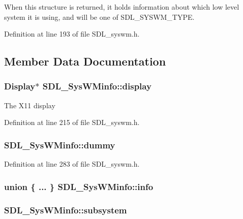 When this structure is returned, it holds information about which low level system it is using, and will be one of S\-D\-L\-\_\-\-S\-Y\-S\-W\-M\-\_\-\-T\-Y\-P\-E. 

Definition at line 193 of file S\-D\-L\-\_\-syswm.\-h.



\subsection{Member Data Documentation}
\hypertarget{struct_s_d_l___sys_w_minfo_a58ef8bc8e1065e95e75a08d08f4a4741}{
\subsubsection[{display}]{\setlength{\rightskip}{0pt plus 5cm}Display$\ast$ S\-D\-L\-\_\-\-Sys\-W\-Minfo\-::display}}\label{struct_s_d_l___sys_w_minfo_a58ef8bc8e1065e95e75a08d08f4a4741}
The X11 display 

Definition at line 215 of file S\-D\-L\-\_\-syswm.\-h.

\hypertarget{struct_s_d_l___sys_w_minfo_a1edbb8fc4fc59081efe6070f9167c1cf}{
\subsubsection[{dummy}]{ S\-D\-L\-\_\-\-Sys\-W\-Minfo\-::dummy}}\label{struct_s_d_l___sys_w_minfo_a1edbb8fc4fc59081efe6070f9167c1cf}


Definition at line 283 of file S\-D\-L\-\_\-syswm.\-h.

\hypertarget{struct_s_d_l___sys_w_minfo_ab928935e7f73776e61ecc4c169a146f2}{
\subsubsection[{info}]{\setlength{\rightskip}{0pt plus 5cm}union \{ ... \}   S\-D\-L\-\_\-\-Sys\-W\-Minfo\-::info}}\label{struct_s_d_l___sys_w_minfo_ab928935e7f73776e61ecc4c169a146f2}
\hypertarget{struct_s_d_l___sys_w_minfo_a438b6a06ab3ee417293c7b7fc5a23855}{
\subsubsection[{subsystem}]{ S\-D\-L\-\_\-\-Sys\-W\-Minfo\-::subsystem}}\label{struct_s_d_l___sys_w_minfo_a438b6a06ab3ee417293c7b7fc5a23855}


